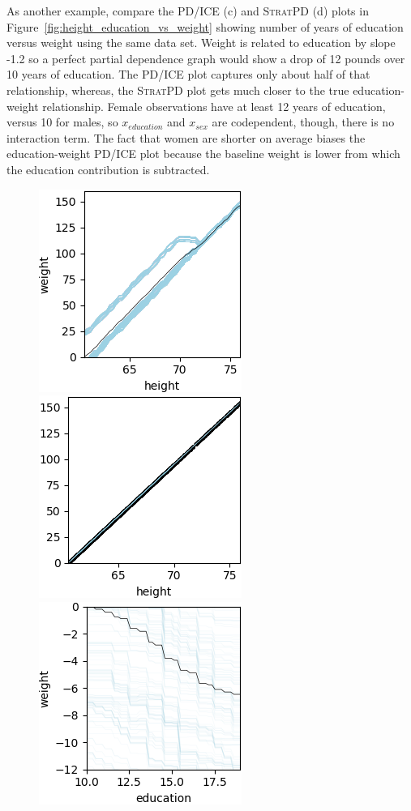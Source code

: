 \documentclass[12pt]{article}
\newcommand{\figref}[1]{Figure~\ref{#1}}
\newcommand{\spd}{\fontfamily{cmr}\textsc{\small StratPD}}
\begin{document}
As another example, compare the PD/ICE (c) and \spd{} (d) plots in \figref{fig:height_education_vs_weight} showing number of years of education versus weight using the same data set. Weight is related to education by slope -1.2 so a perfect partial dependence graph would show a drop of 12 pounds over 10 years of education.   The PD/ICE plot captures only about half of that relationship, whereas, the \spd{} plot gets much closer to the true education-weight relationship. Female observations have at least 12 years of education, versus 10 for males, so $x_{education}$ and $x_{sex}$ are codependent, though, there is no interaction term. The fact that women are shorter on average biases the education-weight PD/ICE plot because the baseline weight is lower from which the education contribution is  subtracted.

\begin{figure}[htbp]
\begin{center}
\includegraphics[scale=0.7]{images/height_vs_weight_pdp.png}
\includegraphics[scale=0.7]{images/height_vs_weight_stratpd.png}\\
\includegraphics[scale=0.7]{images/education_vs_weight_pdp.png}

\end{center}
\end{figure}
\end{document}
